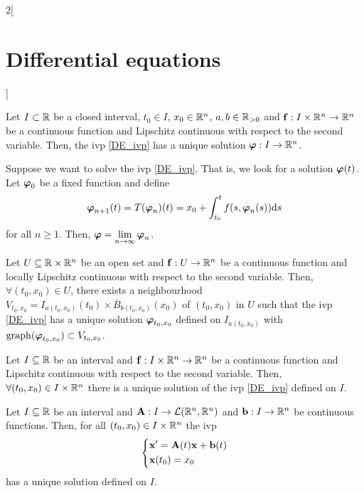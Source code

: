 \documentclass[../../../main.tex]{subfiles}
\begin{document}
\begin{multicols}{2}[\section{Differential equations}]
\begin{theorem}
  \end{theorem}
  \begin{prop}
    Let $I\subset \mathbb{R}$ be a closed interval, $t_0\in I$, $x_0\in\mathbb{R}^n$, $a,b\in\mathbb{R}_{>0}$ and $\boldsymbol{\mathrm{f}}:I\times\mathbb{R}^n\rightarrow\mathbb{R}^n$ be a continuous function and Lipschitz continuous with respect to the second variable. Then, the ivp \eqref{DE_ivp} has a unique solution $\boldsymbol{\mathrm{\varphi}}:I\rightarrow\mathbb{R}^n$.
  \end{prop}
  \begin{corollary}
    Suppose we want to solve the ivp \eqref{DE_ivp}. That is, we look for a solution $\boldsymbol{\mathrm{\varphi}}(t)$. Let $\boldsymbol{\mathrm{\varphi}}_0$ be a fixed function and define
    $$\boldsymbol{\mathrm{\varphi}}_{n+1}(t)=T(\boldsymbol{\mathrm{\varphi}}_n)(t)=x_0+\int_{t_0}^tf(s,\boldsymbol{\mathrm{\varphi}}_n(s))\dd s$$
    for all $n\geq 1$. Then, $\displaystyle\boldsymbol{\mathrm{\varphi}}=\lim_{n\to\infty}\boldsymbol{\mathrm{\varphi}}_n$.
  \end{corollary}
  \begin{corollary}
    Let $U\subseteq\mathbb{R}\times\mathbb{R}^n$ be an open set and $\boldsymbol{\mathrm{f}}:U\rightarrow\mathbb{R}^n$ be a continuous function and locally Lipschitz continuous with respect to the second variable. Then, $\forall(t_0,x_0)\in U$, there exists a neighbourhood $V_{t_0,x_0}=I_{a(t_0,x_0)}(t_0)\times\overline{B}_{b(t_0,x_0)}(x_0)$ of $(t_0,x_0)$ in $U$ such that the ivp \eqref{DE_ivp} has a unique solution $\boldsymbol{\mathrm{\varphi}}_{t_0,x_0}$ defined on $I_{a(t_0,x_0)}$ with $\operatorname{graph}(\boldsymbol{\mathrm{\varphi}}_{t_0,x_0})\subset V_{t_0,x_0}$.
  \end{corollary}
  \begin{prop}
    Let $I\subseteq\mathbb{R}$ be an interval and $\boldsymbol{\mathrm{f}}:I\times\mathbb{R}^n\rightarrow\mathbb{R}^n$ be a continuous function and Lipschitz continuous with respect to the second variable. Then, $\forall(t_0,x_0)\in I\times\mathbb{R}^n$ there is a unique solution of the ivp \eqref{DE_ivp} defined on $I$.
  \end{prop}
  \begin{corollary}
    Let $I\subseteq\mathbb{R}$ be an interval and $\boldsymbol{\mathrm{A}}:I\rightarrow\mathcal{L}(\mathbb{R}^n,\mathbb{R}^n)$ and $\boldsymbol{\mathrm{b}}:I\rightarrow\mathbb{R}^n$ be continuous functions. Then, for all $(t_0,x_0)\in I\times\mathbb{R}^n$ the ivp
    $$
      \left\{
      \begin{aligned}
         & \boldsymbol{\mathrm{x}}'=\boldsymbol{\mathrm{A}}(t)\boldsymbol{\mathrm{x}}+\boldsymbol{\mathrm{b}}(t) \\
         & \boldsymbol{\mathrm{x}}(t_0)=x_0
      \end{aligned}
      \right.
    $$
    has a unique solution defined on $I$.
  \end{corollary}

\end{multicols}
\end{document}
